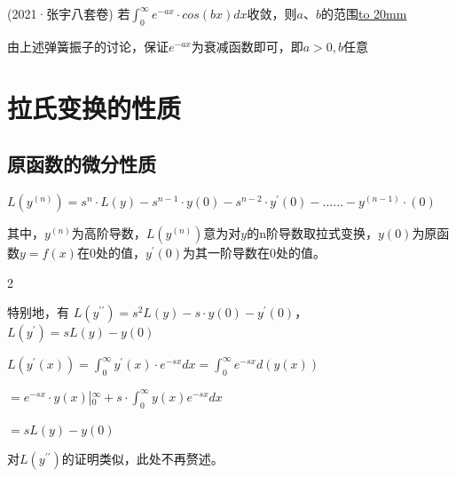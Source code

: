 \vspace{10pt}

(2021·张宇八套卷) 若$\int_{0}^{\infty}e^{-ax}\cdot cos\left(bx\right)dx$收敛，则$a、b$的范围\underline{\hbox to 20mm{}}

 由上述弹簧振子的讨论，保证$e^{-ax}$为衰减函数即可，即$a>0,b$任意

\section{拉氏变换的性质}
\subsection{原函数的微分性质}

\hspace{1em} $L\left(y^{\left(n\right)}\right)=s^{n}\cdot L\left(y\right)-s^{n-1}\cdot y\left(0\right)-s^{n-2}\cdot y^{\prime}\left(0\right)-......-y^{(n-1)}\cdot\left(0\right)$


 其中，$y^{\left(n\right)}$为高阶导数，$L\left(y^{\left(n\right)}\right)$意为对$y$的n阶导数取拉式变换，$y(0)$为原函数$y=f(x)$在0处的值，$y^{\prime}\left(0\right)$为其一阶导数在0处的值。
 
 \vspace{-15pt}
 
 \begin{spacing}{2}
 	 \begin{center}
 		特别地，有
 		\hspace{1em}$L\left(y^{\prime\prime}\right)=s^{2}L\left(y\right)-s\cdot y\left(0\right)-y^{\prime}\left(0\right)$，$L\left(y^{\prime}\right)=sL\left(y\right)-y\left(0\right)$
 		
 		 \hspace{2em} $L\left(y^{\prime}\left(x\right)\right)=\int_{0}^{\infty}y^{\prime}\left(x\right)\cdot e^{-sx}dx=\int_{0}^{\infty}e^{-sx}d\left(y\left(x\right)\right)$
 		
 		\hspace{8em}
 		$=e^{-sx}\cdot y\left(x\right)\left|_{0}^{\infty}\right.+s\cdot\int_{0}^{\infty}y\left(x\right)e^{-sx}dx$
 		
 		$=sL\left(y\right)-y\left(0\right)\:$
 	\end{center}
 \end{spacing}
 
 \vspace{-13pt}

\hspace{3cm}对$L\left(y^{\prime\prime}\right)$的证明类似，此处不再赘述。

